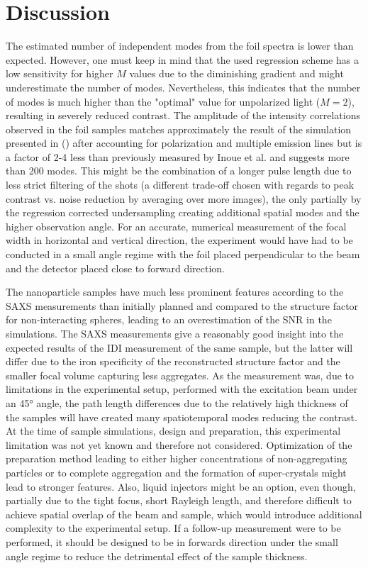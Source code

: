 \section{Discussion}

The estimated number of independent modes from the foil spectra is lower than expected. However, one must keep in mind that the used regression scheme has a low sensitivity for higher $M$ values due to the diminishing gradient and might underestimate the number of modes. Nevertheless, this indicates that the number of modes is much higher than the "optimal" value for unpolarized light ($M=2$), resulting in severely reduced contrast. The amplitude of the intensity correlations observed in the foil samples matches approximately the result of the simulation presented in   () after accounting for polarization and multiple emission lines but is a factor of 2-4 less than previously measured by Inoue et al. and suggests more than 200 modes. This might be the combination of a longer pulse length due to less strict filtering of the shots (a different trade-off chosen with regards to peak contrast vs. noise reduction by averaging over more images), the only partially by the regression corrected undersampling creating additional spatial modes and the higher observation angle. For an accurate, numerical measurement of the focal width in horizontal and vertical direction, the experiment would have had to be conducted in a small angle regime with the foil placed perpendicular to the beam and the detector placed close to forward direction.

The nanoparticle samples have much less prominent features according to the SAXS measurements than initially planned and compared to the structure factor for non-interacting spheres, leading to an overestimation of the SNR in the simulations. The SAXS measurements give a reasonably good insight into the expected results of the IDI measurement of the same sample, but the latter will differ due to the iron specificity of the reconstructed structure factor and the smaller focal volume capturing less aggregates. As the measurement was, due to limitations in the experimental setup, performed with the excitation beam under an 45° angle, the path length differences due to the relatively high thickness of the samples will have created many spatiotemporal modes reducing the contrast. At the time of sample simulations, design and preparation, this experimental limitation was not yet known and therefore not considered.
Optimization of the preparation method leading to either higher concentrations of non-aggregating particles or to complete aggregation and the formation of super-crystals might lead to stronger features. Also, liquid injectors might be an option, even though, partially due to the tight focus, short Rayleigh length, and therefore difficult to achieve spatial overlap of the beam and sample, which would introduce additional complexity to the experimental setup. If a follow-up measurement were to be performed, it should be designed to be in forwards direction under the small angle regime to reduce the detrimental effect of the sample thickness.


